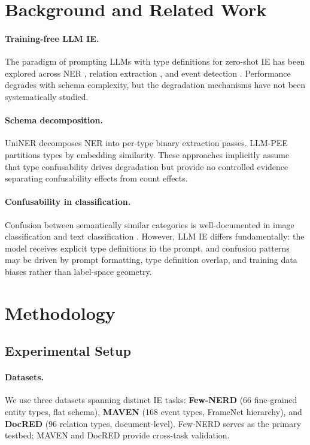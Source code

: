 \documentclass[11pt,a4paper]{article}
\begin{document}
\section{Background and Related Work}

\paragraph{Training-free LLM IE.}
The paradigm of prompting LLMs with type definitions for zero-shot IE has been explored across NER \cite{}, relation extraction \cite{}, and event detection \cite{}.
Performance degrades with schema complexity, but the degradation mechanisms have not been systematically studied.

\paragraph{Schema decomposition.}
UniNER decomposes NER into per-type binary extraction passes.
LLM-PEE partitions types by embedding similarity.
These approaches implicitly assume that type confusability drives degradation but provide no controlled evidence separating confusability effects from count effects.

\paragraph{Confusability in classification.}
Confusion between semantically similar categories is well-documented in image classification \cite{} and text classification \cite{}.
However, LLM IE differs fundamentally: the model receives explicit type definitions in the prompt, and confusion patterns may be driven by prompt formatting, type definition overlap, and training data biases rather than label-space geometry.

\section{Methodology}

\subsection{Experimental Setup}

\paragraph{Datasets.}
We use three datasets spanning distinct IE tasks:
\textbf{Few-NERD} (66 fine-grained entity types, flat schema),
\textbf{MAVEN} (168 event types, FrameNet hierarchy),
and \textbf{DocRED} (96 relation types, document-level).
Few-NERD serves as the primary testbed; MAVEN and DocRED provide cross-task validation.
\end{document}
